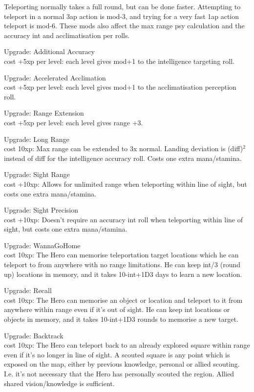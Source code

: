Teleporting normally takes a full round, but can be done faster. Attempting to teleport in a normal 3ap action is mod-3, and trying for a very fast 1ap action teleport is mod-6. These mods also affect the max range psy calculation and the accuracy int and acclimatisation per rolls. %

Upgrade: Additional Accuracy\\
cost +5xp per level: each level gives mod+1 to the intelligence targeting roll.

Upgrade: Accelerated Acclimation\\
cost +5xp per level: each level gives mod+1 to the acclimatisation perception roll.

Upgrade: Range Extension\\
cost +5xp per level: each level gives range +3.

Upgrade: Long Range\\
cost 10xp: Max range can be extended to 3x normal. Landing deviation is (diff)$^2$ instead of diff for the intelligence accuracy roll. Costs one extra mana/stamina.

Upgrade: Sight Range\\
cost +10xp: Allows for unlimited range when teleporting within line of sight, but costs one extra mana/stamina.

Upgrade: Sight Precision\\
cost +10xp: Doesn't require an accuracy int roll when teleporting within line of sight, but costs one extra mana/stamina.

Upgrade: WannaGoHome\\
cost 10xp: The Hero can memorise teleportation target locations which he can teleport to from anywhere with no range limitations. He can keep int/3 (round up) locations in memory, and it takes 10-int+1D3 days to learn a new location.

Upgrade: Recall\\
cost 10xp: The Hero can memorise an object or location and teleport to it from anywhere within range even if it's out of sight. He can keep int locations or objects in memory, and it takes 10-int+1D3 rounds to memorise a new target.

Upgrade: Backtrack\\
cost 10xp: The Hero can teleport back to an already explored square within range even if it's no longer in line of sight. A scouted square is any point which is exposed on the map, either by previous knowledge, personal or allied scouting. I.e. it's not necessary that the Hero has personally scouted the region. Allied shared vision/knowledge is sufficient.

